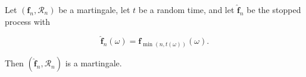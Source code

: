 Let $(\mathbf{f}_n, \mathcal{R}_n)$ be a martingale, let $t$ be a random time, and let $\hat{\mathbf{f}}_n$ be the stopped process with

$$\hat{\mathbf{f}}_n(\omega) = \mathbf{f}_{\min(n, t(\omega))}(\omega).$$

Then $(\hat{\mathbf{f}}_n, \mathcal{R}_n)$ is a martingale.
